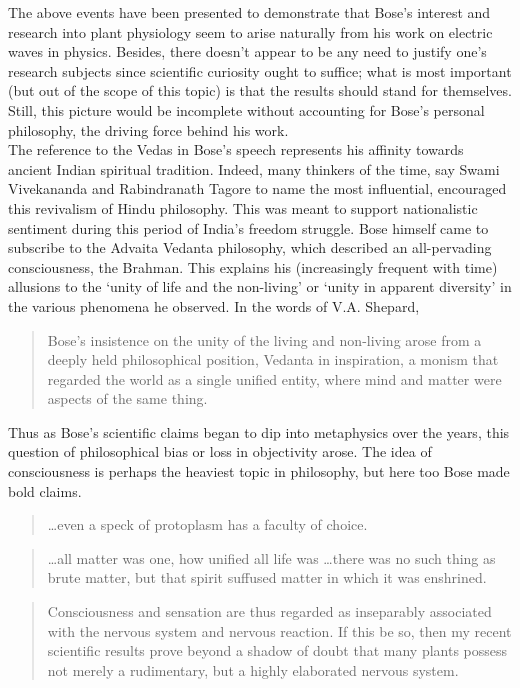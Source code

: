 \documentclass[11pt]{article}
\theoremstyle{remark}
\begin{document}
    The above events have been presented to demonstrate that Bose's interest and
    research into plant physiology seem to arise naturally from his work on electric
    waves in physics. Besides, there doesn't appear to be any need to justify one's
    research subjects since scientific curiosity ought to suffice; what is most
    important (but out of the scope of this topic) is that the results should stand
    for themselves. Still, this picture would be incomplete without accounting for
    Bose's personal philosophy, the driving force behind his work. \\

    The reference to the Vedas in Bose's speech represents his affinity towards
    ancient Indian spiritual tradition. Indeed, many thinkers of the time, say Swami
    Vivekananda and Rabindranath Tagore to name the most influential, encouraged this
    revivalism of Hindu philosophy. This was meant to support nationalistic sentiment
    during this period of India's freedom struggle. Bose himself came to subscribe to
    the Advaita Vedanta philosophy, which described an all-pervading consciousness,
    the Brahman. This explains his (increasingly frequent with time) allusions to the
    `unity of life and the non-living' or `unity in apparent diversity' in the
    various phenomena he observed. In the words of V.A. Shepard, 
    \begin{quote}
        Bose's insistence on the unity of the living and non-living arose from a
        deeply held philosophical position, Vedanta in inspiration, a monism that
        regarded the world as a single unified entity, where mind and matter were
        aspects of the same thing.
    \end{quote}
    Thus as Bose's scientific claims began to dip into metaphysics over the years,
    this question of philosophical bias or loss in objectivity arose. The idea of
    consciousness is perhaps the heaviest topic in philosophy, but here too Bose made
    bold claims.
    \begin{quote}
        \dots even a speck of protoplasm has a faculty of choice.
    \end{quote}
    \begin{quote}
        \dots all matter was one, how unified all life was \dots there was no such
        thing as brute matter, but that spirit suffused matter in which it was
        enshrined.
    \end{quote}
    \begin{quote}
        Consciousness and sensation are thus regarded as inseparably associated with
        the nervous system and nervous reaction. If this be so, then my recent
        scientific results prove beyond a shadow of doubt that many plants possess
        not merely a rudimentary, but a highly elaborated nervous system.
    \end{quote}
\end{document}
